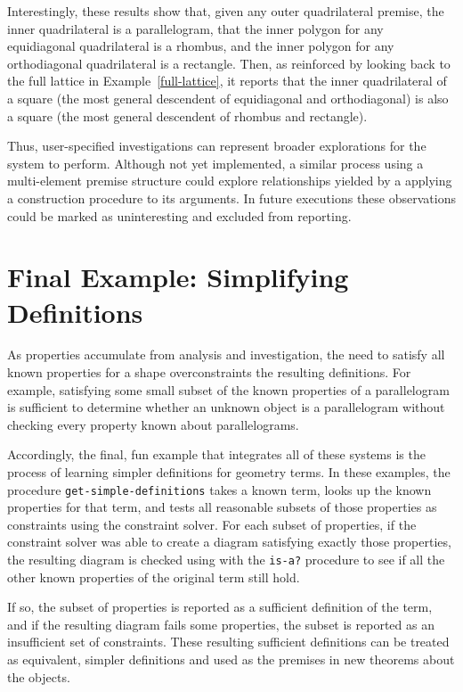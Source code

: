 Interestingly, these results show that, given any outer quadrilateral
premise, the inner quadrilateral is a parallelogram, that the inner
polygon for any equidiagonal quadrilateral is a rhombus, and the inner
polygon for any orthodiagonal quadrilateral is a rectangle. Then, as
reinforced by looking back to the full lattice in
Example~\ref{full-lattice}, it reports that the inner quadrilateral of
a square (the most general descendent of equidiagonal and
orthodiagonal) is also a square (the most general descendent of
rhombus and rectangle).


Thus, user-specified investigations can represent broader explorations
for the system to perform.  Although not yet implemented, a similar
process using a multi-element premise structure could explore
relationships yielded by a applying a construction procedure to its
arguments. In future executions these observations could be marked as
uninteresting and excluded from reporting.

\section{Final Example: Simplifying Definitions}
\label{sec:end-goal-2}

As properties accumulate from analysis and investigation, the need to
satisfy all known properties for a shape overconstraints the resulting
definitions. For example, satisfying some small subset of the known
properties of a parallelogram is sufficient to determine whether an
unknown object is a parallelogram without checking every property
known about parallelograms.

Accordingly, the final, fun example that integrates all of these
systems is the process of learning simpler definitions for geometry
terms. In these examples, the procedure
\texttt{get-simple-definitions} takes a known term, looks up the known
properties for that term, and tests all reasonable subsets of those
properties as constraints using the constraint solver. For each subset
of properties, if the constraint solver was able to create a diagram
satisfying exactly those properties, the resulting diagram is checked
using with the \texttt{is-a?} procedure to see if all the other known
properties of the original term still hold.

If so, the subset of properties is reported as a sufficient definition
of the term, and if the resulting diagram fails some properties, the
subset is reported as an insufficient set of constraints. These
resulting sufficient definitions can be treated as equivalent, simpler
definitions and used as the premises in new theorems about the
objects.

